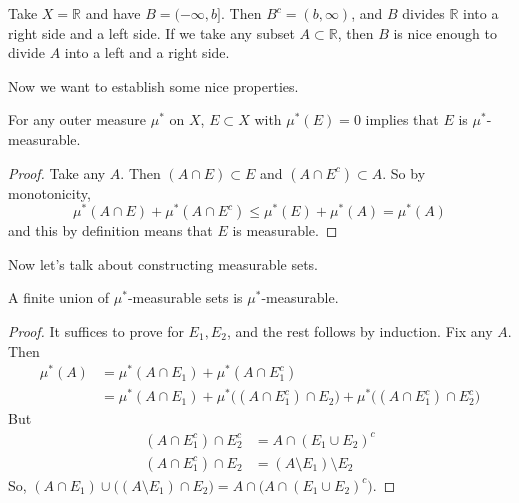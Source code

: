   \begin{example}
    Take $X = \mathbb{R}$ and have $B = (-\infty, b]$. Then $B^c = (b, \infty)$, and $B$ divides $\mathbb{R}$ into a right side and a left side. If we take any subset $A \subset \mathbb{R}$, then $B$ is nice enough to divide $A$ into a left and a right side. 
  \end{example} 

  Now we want to establish some nice properties. 

  \begin{theorem}
    For any outer measure $\mu^\ast$ on $X$, $E \subset X$ with $\mu^\ast (E) = 0$  implies that $E$ is $\mu^\ast$-measurable. 
  \end{theorem}
  \begin{proof}
    Take any $A$. Then $(A \cap E) \subset E$ and $(A \cap E^c) \subset A$. So by monotonicity, 
    \begin{equation}
      \mu^\ast(A \cap E) + \mu^\ast (A \cap E^c) \leq \mu^\ast(E) + \mu^\ast(A) = \mu^\ast (A)
    \end{equation}
    and this by definition means that $E$ is measurable. 
  \end{proof}

  Now let's talk about constructing measurable sets. 

  \begin{theorem}
    A finite union of $\mu^\ast$-measurable sets is $\mu^\ast$-measurable. 
  \end{theorem}
  \begin{proof}
    It suffices to prove for $E_1, E_2$, and the rest follows by induction. Fix any $A$. Then 
    \begin{align}
      \mu^\ast (A) & = \mu^\ast (A \cap E_1) + \mu^\ast (A \cap E_1^c) \\ 
                   & = \mu^\ast (A \cap E_1) + \mu^\ast \big((A \cap E_1^c) \cap E_2 \big) + \mu^\ast \big((A \cap E_1^c) \cap E_2^c \big)
    \end{align}
    But 
    \begin{align}
      (A \cap E_1^c) \cap E_2^c & = A \cap (E_1 \cup E_2)^c \\ 
      (A \cap E_1^c) \cap E_2 & = (A \setminus E_1) \setminus E_2 
    \end{align}
    So, $(A \cap E_1) \cup \big( (A \setminus E_1) \cap E_2 \big) = A \cap \big(A \cap (E_1 \cup E_2)^c \big)$. 
  \end{proof} 

